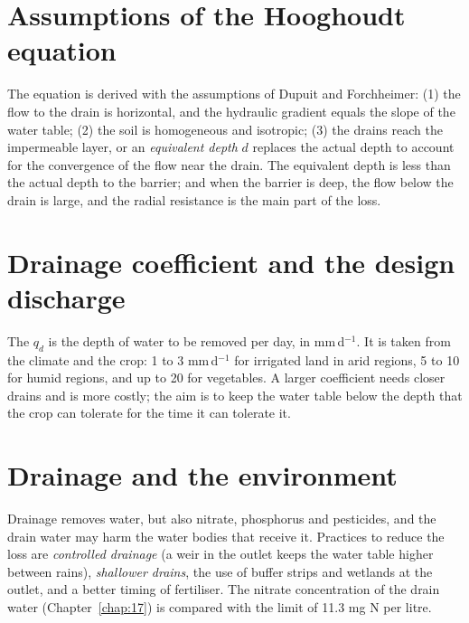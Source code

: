 \section{Assumptions of the Hooghoudt equation}
The equation is derived with the assumptions of Dupuit and Forchheimer: (1) the flow to the drain is horizontal, and the hydraulic gradient equals the slope of the water table; (2) the soil is homogeneous and isotropic; (3) the drains reach the impermeable layer, or an \emph{equivalent depth} $d$ replaces the actual depth to account for the convergence of the flow near the drain. The equivalent depth is less than the actual depth to the barrier; and when the barrier is deep, the flow below the drain is large, and the radial resistance is the main part of the loss.

\section{Drainage coefficient and the design discharge}
The  $q_d$ is the depth of water to be removed per day, in mm\,d$^{-1}$. It is taken from the climate and the crop: 1 to 3 mm\,d$^{-1}$ for irrigated land in arid regions, 5 to 10 for humid regions, and up to 20 for vegetables. A larger coefficient needs closer drains and is more costly; the aim is to keep the water table below the depth that the crop can tolerate for the time it can tolerate it.

\section{Drainage and the environment}
Drainage removes water, but also nitrate, phosphorus and pesticides, and the drain water may harm the water bodies that receive it. Practices to reduce the loss are \emph{controlled drainage} (a weir in the outlet keeps the water table higher between rains), \emph{shallower drains}, the use of buffer strips and wetlands at the outlet, and a better timing of fertiliser. The nitrate concentration of the drain water (Chapter~\ref{chap:17}) is compared with the limit of 11.3 mg N per litre.
